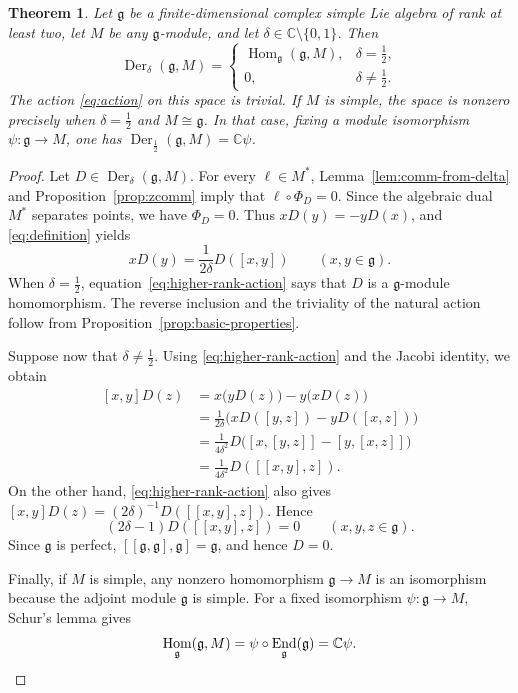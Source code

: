 \documentclass[11pt,reqno]{amsart}
\numberwithin{equation}{section}
\newcommand{\C}{\mathbb C}
\newcommand{\g}{\mathfrak g}
\DeclareMathOperator{\Der}{Der}
\DeclareMathOperator{\Hom}{Hom}
\DeclareMathOperator{\End}{End}
\newtheorem{theorem}{Theorem}[section]
\theoremstyle{definition}
\theoremstyle{remark}
\begin{document}
\begin{theorem}\label{thm:higher-rank-body}
Let \(\g\) be a finite-dimensional complex simple Lie algebra of
rank at least two, let \(M\) be any \(\g\)-module, and let
\(\delta\in\C\setminus\{0,1\}\). Then
\[
\Der_\delta(\g,M)=
\begin{cases}
\Hom_\g(\g,M),&\delta=\frac{1}{2},\\[3pt]
0,&\delta\ne\frac{1}{2}.
\end{cases}
\]
The action \eqref{eq:action} on this space is trivial. If \(M\) is simple,
the space is nonzero precisely when \(\delta=\frac{1}{2}\) and
\(M\cong\g\). In that case, fixing a module isomorphism
\(\psi:\g\to M\), one has \(\Der_{\frac{1}{2}}(\g,M)=\C\psi\).
\end{theorem}
\begin{proof}
Let \(D\in\Der_\delta(\g,M)\). For every \(\ell\in M^*\),
Lemma~\ref{lem:comm-from-delta} and Proposition~\ref{prop:zcomm}
imply that \(\ell\circ\Phi_D=0\). Since the algebraic dual \(M^*\)
separates points, we have \(\Phi_D=0\). Thus \(xD(y)=-yD(x)\), and
\eqref{eq:definition} yields
\begin{equation}\label{eq:higher-rank-action}
xD(y)=\frac{1}{2\delta}D([x,y])\qquad(x,y\in\g).
\end{equation}
When \(\delta=\frac{1}{2}\), equation~\eqref{eq:higher-rank-action}
says that \(D\) is a \(\g\)-module homomorphism. The reverse inclusion
and the triviality of the natural action follow from
Proposition~\ref{prop:basic-properties}.

Suppose now that \(\delta\ne\frac{1}{2}\). Using \eqref{eq:higher-rank-action}
and the Jacobi identity, we obtain
\[
\begin{aligned}
[x,y]D(z)
&=x\bigl(yD(z)\bigr)-y\bigl(xD(z)\bigr)\\
&=\frac{1}{2\delta}\bigl(xD([y,z])-yD([x,z])\bigr)\\
&=\frac{1}{4\delta^2}D\bigl([x,[y,z]]-[y,[x,z]]\bigr)\\
&=\frac{1}{4\delta^2}D([[x,y],z]).
\end{aligned}
\]
On the other hand, \eqref{eq:higher-rank-action} also gives
\([x,y]D(z)=(2\delta)^{-1}D([[x,y],z])\). Hence
\[
(2\delta-1)D([[x,y],z])=0\qquad(x,y,z\in\g).
\]
Since \(\g\) is perfect, \([[\g,\g],\g]=\g\), and hence \(D=0\).

Finally, if \(M\) is simple, any nonzero homomorphism \(\g\to M\)
is an isomorphism because the adjoint module \(\g\) is simple.
For a fixed isomorphism \(\psi:\g\to M\), Schur's lemma gives
\[
\Hom_\g(\g,M)=\psi\circ\End_\g(\g)=\C\psi.\qedhere
\]
\end{proof}
\end{document}
